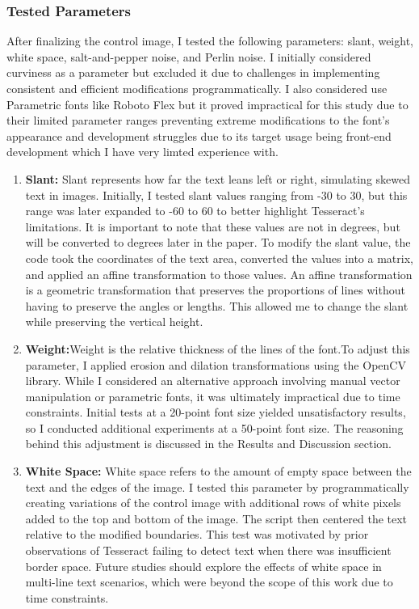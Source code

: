 \documentclass[10pt,twocolumn]{article}
\begin{document}
\subsubsection{Tested Parameters}
After finalizing the control image, I tested the following parameters: slant, weight, white space, salt-and-pepper noise, and Perlin noise. I initially considered curviness as a parameter but excluded it due to challenges in implementing consistent and efficient modifications programmatically. I also considered use Parametric fonts like Roboto Flex but it proved impractical for this study due to their limited parameter ranges preventing extreme modifications to the font's appearance and development struggles due to its target usage being front-end development which I have very limted experience with.

\begin{enumerate}
    \item \textbf{Slant:}  Slant represents how far the text leans left or right, simulating skewed text in images. Initially, I tested slant values ranging from -30 to 30, but this range was later expanded to -60 to 60 to better highlight Tesseract’s limitations. It is important to note that these values are not in degrees, but will be converted to degrees later in the paper. To modify the slant value, the code took the coordinates of the text area, converted the values into a matrix,  and applied an affine transformation to those values. An affine transformation is a geometric transformation that preserves the proportions of lines without having to preserve the angles or lengths\cite{mathworld_affine}. This allowed me to change the slant while preserving the vertical height.\
    \item \textbf{Weight:}Weight is the relative thickness of the lines of the font.To adjust this parameter, I applied erosion and dilation transformations using the OpenCV library. While I considered an alternative approach involving manual vector manipulation or parametric fonts, it was ultimately impractical due to time constraints. Initial tests at a 20-point font size yielded unsatisfactory results, so I conducted additional experiments at a 50-point font size. The reasoning behind this adjustment is discussed in the Results and Discussion section.
    \item \textbf{White Space:} White space refers to the amount of empty space between the text and the edges of the image. I tested this parameter by programmatically creating variations of the control image with additional rows of white pixels added to the top and bottom of the image. The script then centered the text relative to the modified boundaries. This test was motivated by prior observations of Tesseract failing to detect text when there was insufficient border space. Future studies should explore the effects of white space in multi-line text scenarios, which were beyond the scope of this work due to time constraints.

\end{enumerate}
\end{document}
